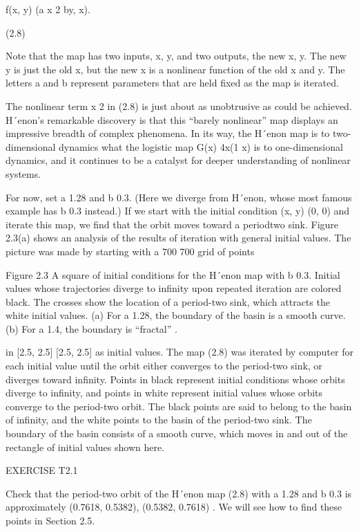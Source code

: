 \documentclass[12pt]{article}
\begin{document}
f(x, y)  (a  x 2  by, x).

(2.8)

Note that the map has two inputs, x, y, and two outputs, the new x, y. The new y is just the old x, but the new x is a nonlinear 
function of the old x and y. The letters a and b represent parameters that are held ﬁxed as the map is iterated.

The nonlinear term x 2 in (2.8) is just about as unobtrusive as could be achieved. H´enon’s remarkable discovery is that this “barely 
nonlinear” map displays an impressive breadth of complex phenomena. In its way, the H´enon map is to two-dimensional dynamics what 
the logistic map G(x)  4x(1  x) is to one-dimensional dynamics, and it continues to be a catalyst for deeper understanding of 
nonlinear systems.

For now, set a  1.28 and b  0.3. (Here we diverge from H´enon, whose most famous example has b  0.3 instead.) If we start with the 
initial condition (x, y)  (0, 0) and iterate this map, we ﬁnd that the orbit moves toward a periodtwo sink. Figure 2.3(a) shows an 
analysis of the results of iteration with general initial values. The picture was made by starting with a 700 700 grid of points

Figure 2.3 A square of initial conditions for the H´enon map with b  0.3. Initial values whose trajectories diverge to inﬁnity upon 
repeated iteration are colored black. The crosses show the location of a period-two sink, which attracts the white initial values. 
(a) For a  1.28, the boundary of the basin is a smooth curve. (b) For a  1.4, the boundary is “fractal” .


in [2.5, 2.5] [2.5, 2.5] as initial values. The map (2.8) was iterated by computer for each initial value until the orbit either 
converges to the period-two sink, or diverges toward inﬁnity. Points in black represent initial conditions whose orbits diverge to 
inﬁnity, and points in white represent initial values whose orbits converge to the period-two orbit. The black points are said to 
belong to the basin of inﬁnity, and the white points to the basin of the period-two sink. The boundary of the basin consists of a 
smooth curve, which moves in and out of the rectangle of initial values shown here.

EXERCISE T2.1

Check that the period-two orbit of the H´enon map (2.8) with a  1.28 and b  0.3 is approximately  (0.7618, 0.5382), (0.5382, 0.7618)  
. We will see how to ﬁnd these points in Section 2.5.
\end{document}

